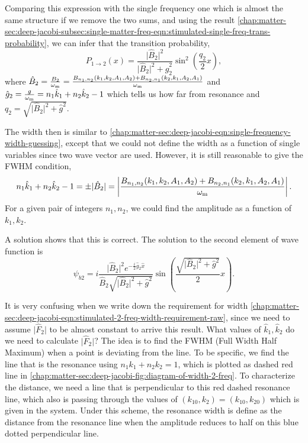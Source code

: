 Comparing this expression with the single frequency one which is almost the same structure if we remove the two sums, and using the result \ref{chap:matter-sec:deep-jacobi-subsec:single-matter-freq-eqn:stimulated-single-freq-trans-probability}, we can infer that the transition probability,
\begin{equation}
    P_{1\to 2}(x) = \frac{\lvert \hat B_2 \rvert^2}{ \lvert \hat B_2 \rvert^2 + \hat g_2^2} \sin^2\left( \frac{q_2}{2}x \right),
\end{equation}
where $\hat B_2=\frac{ B_2 }{\omega_\mathrm m}=\frac{B_{n_1,n_2}(k_1,k_2,A_1,A_2) + B_{n_2,n_1}(k_2,k_1,A_2,A_1)}{\omega_\mathrm m}$ and $\hat g_2 = \frac{g}{\omega_\mathrm m} = n_1 \hat k_1 + n_2 \hat k_2 - 1$ which tells us how far from resonance and $q_2=\sqrt{ \lvert \hat B_2 \rvert^2 + \hat g^2 }$.

The width then is similar to \ref{chap:matter-sec:deep-jacobi-eqn:single-frequency-width-guessing}, except that we could not define the width as a function of single variables since two wave vector are used. However, it is still reasonable to give the FWHM condition,
\begin{equation}
   n_1 \hat k_1 + n_2 \hat k_2 - 1 = \pm \lvert \hat B_2 \rvert = \left\lvert \frac{B_{n_1,n_2}(k_1,k_2,A_1,A_2) + B_{n_2,n_1}(k_2,k_1,A_2,A_1)}{\omega_\mm} \right\rvert.
   \label{chap:matter-sec:deep-jacobi-eqn:stimulated-2-freq-width-requirement-raw}
\end{equation}
For a given pair of integers $n_1,n_2$, we could find the amplitude as a function of $k_1, k_2$.

A solution shows that this is correct. The solution to the second element of wave function is
\begin{equation}
  \psi_{b2} = i \frac{ \lvert \hat B_2\rvert^2 e^{-\frac{i}{2} \hat g_2 \hat x} }{ \hat B_2 \sqrt{\lvert \hat B_2\rvert^2 + \hat g^2} }\sin\left( \frac{\sqrt{ \lvert \hat B_2 \rvert^2 + \hat g^2 }}{2}x \right)  .
\end{equation}

It is very confusing when we write down the requirement for width \ref{chap:matter-sec:deep-jacobi-eqn:stimulated-2-freq-width-requirement-raw}, since we need to assume $\lvert \hat F_2 \rvert$ to be almost constant to arrive this result. What values of $\hat k_1,\hat k_2$ do we need to calculate $\lvert \hat F_2 \rvert$? The idea is to find the FWHM (Full Width Half Maximum) when a point is deviating from the line. To be specific, we find the line that is the resonance using $n_1 k_1 + n_2 k_2 = 1$, which is plotted as dashed red line in \ref{chap:matter-sec:deep-jacobi-fig:diagram-of-width-2-freq}. To characterize the distance, we need a line that is perpendicular to this red dashed resonance line, which also is passing through the values of $(k_10,k_2)=(k_{10},k_{20})$ which is given in the system. Under this scheme, the resonance width is define as the distance from the resonance line when the amplitude reduces to half on this blue dotted perpendicular line.



